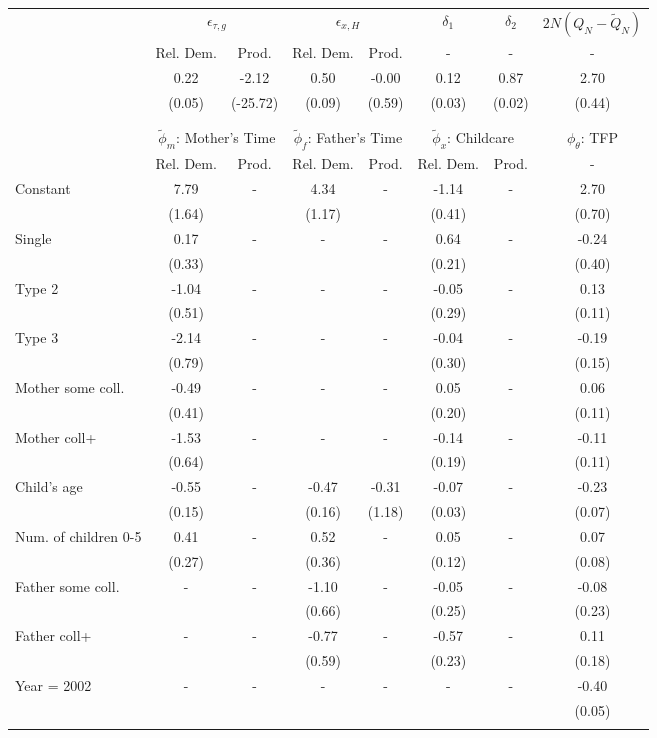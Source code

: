 \begin{tabular}{lccccccc}\toprule
 & \multicolumn{2}{c}{$\epsilon_{\tau,g}$} & \multicolumn{2}{c}{$\epsilon_{x,H}$} & {$\delta_{1}$} & {$\delta_{2}$} & $2N(Q_{N} - \tilde{Q}_{N})$ \\
 & Rel. Dem. & Prod. & Rel. Dem. & Prod. & - & - & - \\\cmidrule(r){2-3}\cmidrule(r){4-5}\cmidrule(r){6-6}\cmidrule(r){7-7}\cmidrule(r){8-8}
&0.22&-2.12&0.50&-0.00&0.12&0.87&2.70\\
&(0.05)&(-25.72)&(0.09)&(0.59)&(0.03)&(0.02)&(0.44)\\
\\
&&&&&&&\\
 & \multicolumn{2}{c}{$\tilde{\phi}_{m}$: Mother's Time} & \multicolumn{2}{c}{$\tilde{\phi}_{f}$: Father's Time} & \multicolumn{2}{c}{$\tilde{\phi}_{x}$: Childcare} &{$\phi_{\theta}$: TFP} \\
 & Rel. Dem. & Prod. & Rel. Dem. & Prod. & Rel. Dem. & Prod. & -  \\\cmidrule(r){2-3}\cmidrule(r){4-5}\cmidrule(r){6-7}\cmidrule(r){8-8}
Constant&7.79& -&4.34& -&-1.14& -&2.70\\
&(1.64)&&(1.17)&&(0.41)&&(0.70)\\
Single&0.17& -& - & -&0.64& -&-0.24\\
&(0.33)& & &&(0.21)&&(0.40)\\
Type 2&-1.04& -& - & -&-0.05& -&0.13\\
&(0.51)& & &&(0.29)&&(0.11)\\
Type 3&-2.14& -& - & -&-0.04& -&-0.19\\
&(0.79)& & &&(0.30)&&(0.15)\\
Mother some coll.&-0.49& -& - & -&0.05& -&0.06\\
&(0.41)& & &&(0.20)&&(0.11)\\
Mother coll+&-1.53& -& - & -&-0.14& -&-0.11\\
&(0.64)& & &&(0.19)&&(0.11)\\
Child's age&-0.55& -&-0.47&-0.31&-0.07& -&-0.23\\
&(0.15)&&(0.16)&(1.18)&(0.03)&&(0.07)\\
Num. of children 0-5&0.41& -&0.52& -&0.05& -&0.07\\
&(0.27)&&(0.36)&&(0.12)&&(0.08)\\
Father some coll.& - & -&-1.10& -&-0.05& -&-0.08\\
 & &&(0.66)&&(0.25)&&(0.23)\\
Father coll+& - & -&-0.77& -&-0.57& -&0.11\\
 & &&(0.59)&&(0.23)&&(0.18)\\
Year = 2002& - & -& - & -& - & -&-0.40\\
 & & & & & &&(0.05)\\
\\
\bottomrule\end{tabular}